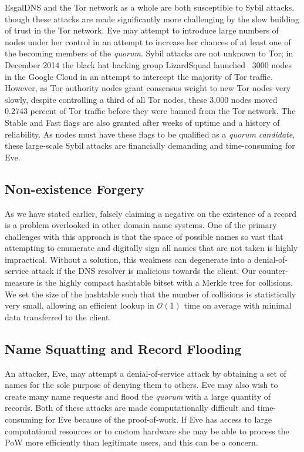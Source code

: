 EsgalDNS and the Tor network as a whole are both susceptible to Sybil attacks, though these attacks are made significantly more challenging by the slow building of trust in the Tor network. Eve may attempt to introduce large numbers of nodes under her control in an attempt to increase her chances of at least one of the becoming members of the \emph{quorum}. Sybil attacks are not unknown to Tor; in December 2014 the black hat hacking group LizardSquad launched ~3000 nodes in the Google Cloud in an attempt to intercept the majority of Tor traffic. However, as Tor authority nodes grant consensus weight to new Tor nodes very slowly, despite controlling a third of all Tor nodes, these 3,000 nodes moved 0.2743 percent of Tor traffic before they were banned from the Tor network. The Stable and Fast flags are also granted after weeks of uptime and a history of reliability. As nodes must have these flags to be qualified as a \emph{quorum} \emph{candidate}, these large-scale Sybil attacks are financially demanding and time-consuming for Eve.

\subsection{Non-existence Forgery}

As we have stated earlier, falsely claiming a negative on the existence of a record is a problem overlooked in other domain name systems. One of the primary challenges with this approach is that the space of possible names so vast that attempting to enumerate and digitally sign all names that are not taken is highly impractical. Without a solution, this weakness can degenerate into a denial-of-service attack if the DNS resolver is malicious towards the client. Our counter-measure is the highly compact hashtable bitset with a Merkle tree for collisions. We set the size of the hashtable such that the number of collisions is statistically very small, allowing an efficient lookup in $ \mathcal{O}(1) $ time on average with minimal data transferred to the client.

\subsection{Name Squatting and Record Flooding}

An attacker, Eve, may attempt a denial-of-service attack by obtaining a set of names for the sole purpose of denying them to others. Eve may also wish to create many name requests and flood the \emph{quorum} with a large quantity of records. Both of these attacks are made computationally difficult and time-consuming for Eve because of the proof-of-work. If Eve has access to large computational resources or to custom hardware she may be able to process the PoW more efficiently than legitimate users, and this can be a concern.

